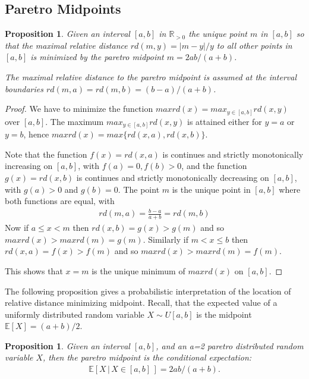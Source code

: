 \documentclass{article}
\theoremstyle{plain}
\newtheorem{proposition}[definition]{Proposition}
\theoremstyle{remark}
\newcommand{\IE}{\mathbb{E}}
\newcommand{\IR}{\mathbb{R}}
\begin{document}
\subsection{Paretro Midpoints}

\begin{proposition} \label{prop:pdist}
  Given an interval $[a,b]$ in $\IR_{>0}$ the unique point $m$ in $[a,b]$ so that the maximal
  relative distance $rd(m, y) = |m-y|/y$ to all other points in $[a,b]$ is minimized
  by the paretro midpoint
  $m = 2ab / (a + b)$.

  The maximal relative distance to the paretro midpoint is assumed at the interval boundaries
  $rd(m,a) = rd(m,b) = (b - a) / (a + b)$.
\end{proposition}

\begin{proof}
  We have to minimize the function $maxrd(x) = max_{y\in[a,b]} rd(x, y)$ over $[a,b]$.
  The maximum $max_{y\in[a,b]} rd(x, y)$ is attained either for $y = a$ or $y = b$,
  hence $maxrd(x) = max\{ rd(x,a), rd(x,b) \}$.

  Note that the function $f(x) = rd(x, a)$ is continues and strictly monotonically increasing on $[a,b]$, with $f(a) = 0, f(b) > 0$,
  and the function $g(x) = rd(x, b)$ is continues and strictly monotonically decreasing on $[a,b]$, with $g(a) > 0$ and $g(b) = 0$.
  The point $m$ is the unique point in $[a,b]$ where both functions are equal, with
  \begin{align*}
    rd(m, a) = \frac{b - a}{a + b} = rd(m, b)
  \end{align*}
  Now if $a \leq x < m$ then $rd(x, b) = g(x) > g(m)$ and so $maxrd(x) > maxrd(m) = g(m)$.
  Similarly if $m < x \leq b$ then $rd(x, a) = f(x) > f(m)$ and so $maxrd(x) > maxrd(m) = f(m)$.

  This shows that $x=m$ is the unique minimum of $maxrd(x)$ on $[a,b]$.
\end{proof}

The following proposition gives a probabilistic interpretation of the location of relative distance minimizing midpoint.
Recall, that the expected value of a uniformly distributed random variable $X \sim U[a,b]$ is the midpoint $\IE[X] = (a+b)/2$.

\begin{proposition}
  Given an interval $[a,b]$, and an a=2 paretro distributed random variable $X$, then
  the paretro midpoint is the conditional expectation:
  \begin{align*}
    \IE[ X \, | \, X \in [a,b] \,] = 2ab / (a + b).
  \end{align*}
\end{proposition}
\end{document}
